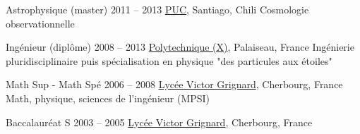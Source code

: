 \def\tbflanguage{french}
\def\tbfbordertop{1}
\def\tbfborderleft{0.7}








\begin{coordinatelist}
\end{coordinatelist}




\begin{yearlist}[7.7][\tbfborderleft][4]


\item[Astrophysique (master)]{2011 -- 2013}
	{
	\href{http://www.uc.cl/}{PUC}, Santiago, Chili
  }
  {Cosmologie observationnelle}


\item[Ingénieur (diplôme)]{2008 -- 2013}
	{
  \href{https://www.polytechnique.edu/}{Polytechnique (X)}, Palaiseau, France
  }
  {Ingénierie pluridisciplinaire puis spécialisation en physique "des particules aux étoiles"}


\item[Math Sup - Math Spé]{2006 -- 2008}
	{
	\href{http://www.lycee-grignard.fr/}{Lyc\'ee Victor Grignard}, Cherbourg, France
	}
	{Math, physique, sciences de l'ingénieur (MPSI)}


\item[Baccalauréat S]{2003 -- 2005}
	{
	\href{http://www.lycee-grignard.fr/}{Lyc\'ee Victor Grignard}, Cherbourg, France
	}
  {\vspace{-0.5cm}}

\end{yearlist}



